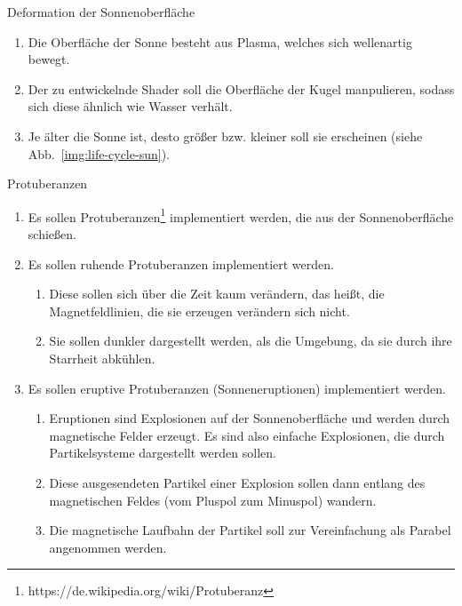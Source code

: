 \documentclass{article}
\begin{document}
\begin{enumerate}
    \vspace{0.5cm}

    {\bfseries\large\item Deformation der Sonnenoberfläche}
    \begin{enumerate}
      \item Die Oberfläche der Sonne besteht aus Plasma, welches sich
        wellenartig bewegt.
      \item Der zu entwickelnde Shader soll die Oberfläche der Kugel
        manpulieren, sodass sich diese ähnlich wie Wasser verhält.
      \item Je älter die Sonne ist, desto größer bzw. kleiner soll sie
        erscheinen (siehe Abb.~\ref{img:life-cycle-sun}).
    \end{enumerate}

    \vspace{0.5cm}

    {\bfseries\large\item Protuberanzen}
    \begin{enumerate}
      \item Es sollen
        Protuberanzen\footnote{https://de.wikipedia.org/wiki/Protuberanz}
        implementiert werden, die aus der Sonnenoberfläche schießen.
      \item Es sollen ruhende Protuberanzen implementiert werden.
      \begin{enumerate}
        \item Diese sollen sich über die Zeit kaum verändern, das heißt, die
          Magnetfeldlinien, die sie erzeugen verändern sich nicht.
        \item Sie sollen dunkler dargestellt werden, als die Umgebung, da sie
          durch ihre Starrheit abkühlen.
      \end{enumerate}
      \item Es sollen eruptive Protuberanzen (Sonneneruptionen) implementiert werden.
      \begin{enumerate}
        \item Eruptionen sind Explosionen auf der Sonnenoberfläche und werden
          durch magnetische Felder erzeugt. Es sind also einfache Explosionen, die
          durch Partikelsysteme dargestellt werden sollen.
        \item Diese ausgesendeten Partikel einer Explosion sollen dann entlang des
          magnetischen Feldes (vom Pluspol zum Minuspol) wandern.
        \item Die magnetische Laufbahn der Partikel soll zur Vereinfachung als
          Parabel angenommen werden.
      \end{enumerate}
    \end{enumerate}

  \end{enumerate}
\end{document}
